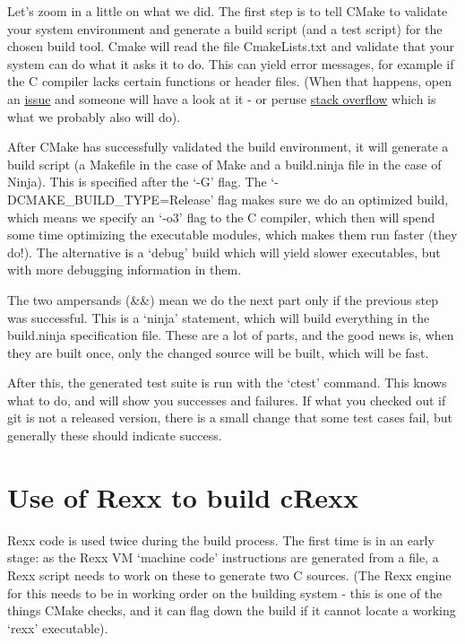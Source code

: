 Let's zoom in a little on what we did. The first step is to tell CMake
to validate your system environment and generate a build script (and a
test script) for the chosen build tool. Cmake will read the file
CmakeLists.txt and validate that your system can do what it asks it to
do. This can yield error messages, for example if the C compiler lacks
certain functions or header files. (When that happens, open an
\href{https://github.com/adesutherland/CREXX/issues}{issue} and someone
will have a look at it - or peruse
\href{https://stackoverflow.com}{stack overflow} which is what we
probably also will do).

After CMake has successfully validated the build environment, it will
generate a build script (a Makefile in the case of Make and a
build.ninja file in the case of Ninja). This is specified after the `-G'
flag. The `-DCMAKE\_BUILD\_TYPE=Release' flag makes sure we do an
optimized build, which means we specify an `-o3' flag to the C compiler,
which then will spend some time optimizing the executable modules, which
makes them run faster (they do!). The alternative is a `debug' build
which will yield slower executables, but with more debugging information
in them.

The two ampersands (\&\&) mean we do the next part only if the previous
step was successful. This is a `ninja' statement, which will build
everything in the build.ninja specification file. These are a lot of
parts, and the good news is, when they are built once, only the changed
source will be built, which will be fast.

After this, the generated test suite is run with the `ctest' command.
This knows what to do, and will show you successes and failures. If what
you checked out if git is not a released version, there is a small
change that some test cases fail, but generally these should indicate
success.

\hypertarget{use-of-rexx-to-build-crexx}{%
\section{Use of Rexx to build cRexx}\label{use-of-rexx-to-build-crexx}}

Rexx code is used twice during the build process. The first time is in
an early stage: as the Rexx VM `machine code' instructions are generated
from a file, a Rexx script needs to work on these to generate two C
sources. (The Rexx engine for this needs to be in working order on the
building system - this is one of the things CMake checks, and it can
flag down the build if it cannot locate a working `rexx' executable).


